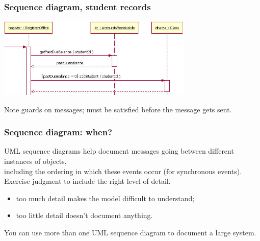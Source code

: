 \begin{frame}
\frametitle{Sequence diagram, student records}

\begin{changemargin}{1cm}
\begin{center}
\includegraphics[width=0.7\textwidth]{images/student_records.png}
\end{center}
Note guards on messages; must be satisfied before
the message gets sent.\\

\end{changemargin}
\end{frame}

\begin{frame}
\frametitle{Sequence diagram: when?}

\begin{changemargin}{1cm}
UML sequence
diagrams help document messages going between different instances of
objects, \\ including the ordering in which these events occur  (for synchronous events).\\[1em]

Exercise judgment to include the right level of detail.\\
\begin{itemize}
\item too much detail makes the model difficult to
understand;
\item too little detail doesn't document anything.
\end{itemize}

You can use more than one UML sequence diagram to document a large system.
\end{changemargin}
\end{frame}






